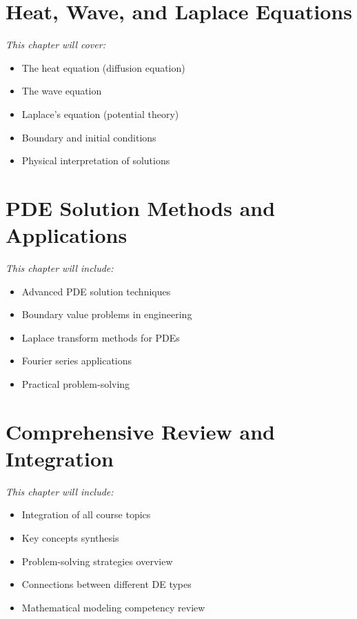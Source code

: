 \documentclass[12pt, letterpaper]{book}
\begin{document}
\chapter{Heat, Wave, and Laplace Equations}
\label{chap:session_18}

\textit{This chapter will cover:}
\begin{itemize}
    \item The heat equation (diffusion equation)
    \item The wave equation
    \item Laplace's equation (potential theory)
    \item Boundary and initial conditions
    \item Physical interpretation of solutions
\end{itemize}

\chapter{PDE Solution Methods and Applications}
\label{chap:session_19}

\textit{This chapter will include:}
\begin{itemize}
    \item Advanced PDE solution techniques
    \item Boundary value problems in engineering
    \item Laplace transform methods for PDEs
    \item Fourier series applications
    \item Practical problem-solving
\end{itemize}


\chapter{Comprehensive Review and Integration}
\label{chap:session_20}

\textit{This chapter will include:}
\begin{itemize}
    \item Integration of all course topics
    \item Key concepts synthesis
    \item Problem-solving strategies overview
    \item Connections between different DE types
    \item Mathematical modeling competency review
\end{itemize}
\end{document}
